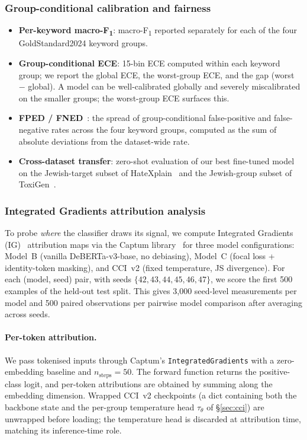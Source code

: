 \documentclass[10pt,a4paper]{article}
\begin{document}
\subsubsection{Group-conditional calibration and fairness}

\begin{itemize}[leftmargin=*,itemsep=1pt]
    \item \textbf{Per-keyword macro-F\textsubscript{1}}: macro-F\textsubscript{1} reported separately for each of the four GoldStandard2024 keyword groups.
    \item \textbf{Group-conditional ECE}: 15-bin ECE computed within each keyword group; we report the global ECE, the worst-group ECE, and the gap (worst $-$ global). A model can be well-calibrated globally and severely miscalibrated on the smaller groups; the worst-group ECE surfaces this.
    \item \textbf{FPED / FNED}~\citep{dixon2018measuring}: the spread of group-conditional false-positive and false-negative rates across the four keyword groups, computed as the sum of absolute deviations from the dataset-wide rate.
    \item \textbf{Cross-dataset transfer}: zero-shot evaluation of our best fine-tuned model on the Jewish-target subset of HateXplain~\citep{mathew2021hatexplain} and the Jewish-group subset of ToxiGen~\citep{hartvigsen2022toxigen}.
\end{itemize}

\subsubsection{Integrated Gradients attribution analysis}
\label{sec:ig_methodology}

To probe \emph{where} the classifier draws its signal, we compute Integrated Gradients (IG)~\citep{sundararajan2017axiomatic} attribution maps via the Captum library~\citep{kokhlikyan2020captum} for three model configurations: Model~B (vanilla DeBERTa-v3-base, no debiasing), Model~C (focal loss + identity-token masking), and CCI~v2 (fixed temperature, JS divergence). For each (model, seed) pair, with seeds $\{42, 43, 44, 45, 46, 47\}$, we score the first 500 examples of the held-out test split. This gives 3{,}000 seed-level measurements per model and 500 paired observations per pairwise model comparison after averaging across seeds.

\paragraph{Per-token attribution.}
We pass tokenised inputs through Captum's \texttt{IntegratedGradients} with a zero-embedding baseline and $n_{\text{steps}} = 50$. The forward function returns the positive-class logit, and per-token attributions are obtained by summing along the embedding dimension. Wrapped CCI~v2 checkpoints (a dict containing both the backbone state and the per-group temperature head $\tau_\theta$ of \S\ref{sec:cci}) are unwrapped before loading; the temperature head is discarded at attribution time, matching its inference-time role.
\end{document}
